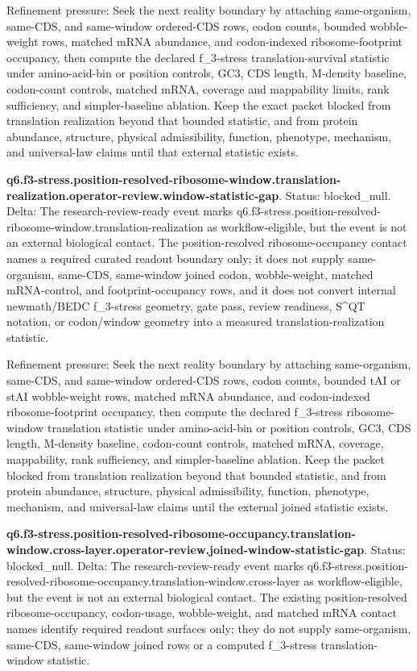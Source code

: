 Refinement pressure: Seek the next reality boundary by attaching same-organism, same-CDS, and same-window ordered-CDS rows, codon counts, bounded wobble-weight rows, matched mRNA abundance, and codon-indexed ribosome-footprint occupancy, then compute the declared f\_3-stress translation-survival statistic under amino-acid-bin or position controls, GC3, CDS length, M-density baseline, codon-count controls, matched mRNA, coverage and mappability limits, rank sufficiency, and simpler-baseline ablation. Keep the exact packet blocked from translation realization beyond that bounded statistic, and from protein abundance, structure, physical admissibility, function, phenotype, mechanism, and universal-law claims until that external statistic exists.

\textbf{q6.f3-stress.position-resolved-ribosome-window.translation-realization.operator-review.window-statistic-gap}. Status: blocked\_null. Delta: The research-review-ready event marks q6.f3-stress.position-resolved-ribosome-window.translation-realization as workflow-eligible, but the event is not an external biological contact. The position-resolved ribosome-occupancy contact names a required curated readout boundary only; it does not supply same-organism, same-CDS, same-window joined codon, wobble-weight, matched mRNA-control, and footprint-occupancy rows, and it does not convert internal newmath/BEDC f\_3-stress geometry, gate pass, review readiness, S\textasciicircum{}QT notation, or codon/window geometry into a measured translation-realization statistic.

Refinement pressure: Seek the next reality boundary by attaching same-organism, same-CDS, and same-window ordered-CDS rows, codon counts, bounded tAI or stAI wobble-weight rows, matched mRNA abundance, and codon-indexed ribosome-footprint occupancy, then compute the declared f\_3-stress ribosome-window translation statistic under amino-acid-bin or position controls, GC3, CDS length, M-density baseline, codon-count controls, matched mRNA, coverage, mappability, rank sufficiency, and simpler-baseline ablation. Keep the packet blocked from translation realization beyond that bounded statistic, and from protein abundance, structure, physical admissibility, function, phenotype, mechanism, and universal-law claims until the external joined statistic exists.

\textbf{q6.f3-stress.position-resolved-ribosome-occupancy.translation-window.cross-layer.operator-review.joined-window-statistic-gap}. Status: blocked\_null. Delta: The research-review-ready event marks q6.f3-stress.position-resolved-ribosome-occupancy.translation-window.cross-layer as workflow-eligible, but the event is not an external biological contact. The existing position-resolved ribosome-occupancy, codon-usage, wobble-weight, and matched mRNA contact names identify required readout surfaces only; they do not supply same-organism, same-CDS, same-window joined rows or a computed f\_3-stress translation-window statistic.

